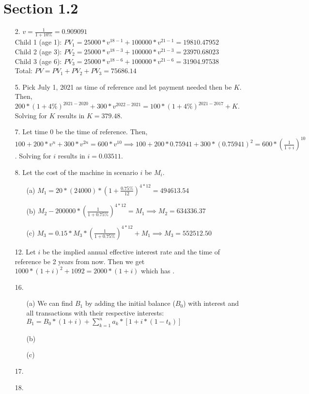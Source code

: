 \documentclass{article}
\begin{document}
\section*{Section 1.2}
\begin{itemize}
    \item [2.]
          $v=\frac{1}{1+10\%}=0.909091$\\
          Child 1 (age 1): $PV_1=25000*v^{18-1}+100000*v^{21-1}=19810.47952$\\
          Child 2 (age 3): $PV_2=25000*v^{18-3}+100000*v^{21-3}=23970.68023$\\
          Child 3 (age 6): $PV_3=25000*v^{18-6}+100000*v^{21-6}=31904.97538$\\
          Total: $PV=PV_1+PV_2+PV_3=\boxed{75686.14}$
    \item [5.]
          Pick July 1, 2021 as time of reference and let payment needed then be $K$. Then, $200*(1+4\%)^{2021-2020}+300*v^{2022-2021}=100*(1+4\%)^{2021-2017}+K$. Solving for $K$ results in $\boxed{K=379.48}$.
    \item [7.]
          Let time 0 be the time of reference. Then, $100+200*v^n+300*v^{2n}=600*v^{10} \implies 100+200*0.75941+300*(0.75941)^2=600*(\frac{1}{1+i})^{10}$. Solving for $i$ results in $\boxed{i=0.03511}$.
    \item [8.]
          Let the cost of the machine in scenario $i$ be $M_i$.
          \begin{itemize}
              \item [(a)] $M_1=20*(24000)*(1+\frac{0.75\%}{12})^{4*12}=\boxed{494613.54}$
              \item [(b)] $M_2-200000*(\frac{1}{1+0.75\%})^{4*12}=M_1 \implies M_2=\boxed{634336.37}$
              \item [(c)] $M_3=0.15*M_3*(\frac{1}{1+0.75\%})^{4*12}+M_1 \implies M_3=\boxed{552512.50}$
          \end{itemize}
    \item [12.] 
    Let $i$ be the implied annual effective interest rate and the time of reference be 2 years from now. Then we get $1000*(1+i)^2+1092=2000*(1+i)$ which has .
    \item [16.] 
    \begin{itemize}
          \item [(a)] We can find $B_1$ by adding the initial balance ($B_0$) with interest and all transactions with their respective interests: $\boxed{B_1=B_0*(1+i)+\sum_{k=1}^{n}a_k*[1+i*(1-t_k)]}$
          \item [(b)] 
          \item [(c)]
    \end{itemize}
    \item [17.]
    \item [18.]
\end{itemize}
\end{document}
